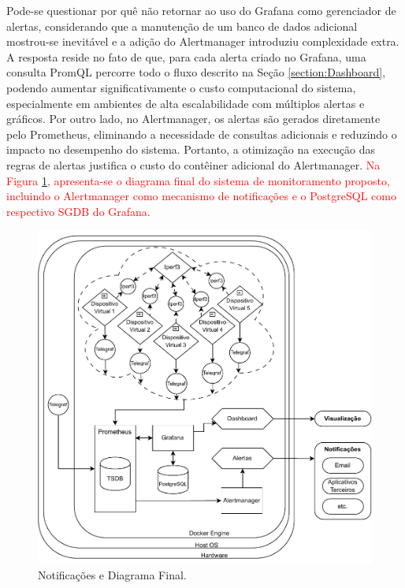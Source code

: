 Pode-se questionar por quê não retornar ao uso do Grafana como gerenciador de alertas, considerando que a manutenção de um banco de dados adicional mostrou-se inevitável e a adição do Alertmanager introduziu complexidade extra. A resposta reside no fato de que, para cada alerta criado no Grafana, uma consulta PromQL percorre todo o fluxo descrito na Seção \ref{section:Dashboard}, podendo aumentar significativamente o custo computacional do sistema, especialmente em ambientes de alta escalabilidade com múltiplos alertas e gráficos. Por outro lado, no Alertmanager, os alertas são gerados diretamente pelo Prometheus, eliminando a necessidade de consultas adicionais e reduzindo o impacto no desempenho do sistema. Portanto, a otimização na execução das regras de alertas justifica o custo do contêiner adicional do Alertmanager. \textcolor{red}{Na Figura \ref{fig:DiagramaAlertas}, apresenta-se o diagrama final do sistema de monitoramento proposto, incluindo o Alertmanager como mecanismo de notificações e o PostgreSQL como respectivo SGDB do Grafana.}

\begin{figure}[H]
\centering
\setlength{\abovecaptionskip}{-20pt}
\includegraphics[width=\textwidth]{Imagens/chap04/by-blocks/alerts_diagram.pdf}
\caption{Notificações e Diagrama Final.}
\label{fig:DiagramaAlertas}
\end{figure}

